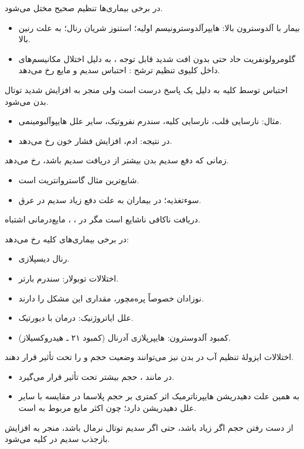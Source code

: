 \documentclass[12pt,a4paper]{article}
\begin{document}
در برخی بیماری‌ها تنظیم صحیح  مختل می‌شود.
\begin{itemize}
\item بیمار با آلدوسترون بالا: هایپرآلدوسترونیسم اولیه؛ استنوز شریان رنال؛ به علت رنین بالا.
\item گلومرولونفریت حاد حتی بدون افت شدید قابل توجه ، به دلیل اختلال مکانیسم‌های داخل کلیوی تنظیم ترشح : احتباس سدیم و  مایع رخ می‌دهد.
\end{itemize}
احتباس  توسط کلیه به دلیل  یک پاسخ درست است ولی منجر به افزایش شدید  توتال بدن می‌شود.
\begin{itemize}
\item مثال: نارسایی قلب، نارسایی کلیه، سندرم نفروتیک، سایر علل هایپوآلبومینمی.
\item در نتیجه: ادم، افزایش فشار خون رخ می‌دهد.
\end{itemize}
زمانی که دفع سدیم بدن بیشتر از دریافت سدیم باشد،  رخ می‌دهد.
\begin{itemize}
\item شایع‌ترین مثال گاستروانتریت است.
\item سوءتغذیه؛ در بیماران  به علت دفع زیاد سدیم در عرق.
\end{itemize}
دریافت ناکافی  ناشایع است مگر در ، ، مایع‌درمانی اشتباه.

 در برخی بیماری‌های کلیه رخ می‌دهد:
\begin{itemize}
\item رنال دیسپلازی.
\item اختلالات توبولار: سندرم بارتر.
\item نوزادان خصوصاً پره‌مچور، مقداری این مشکل را دارند.
\item علل ایاتروژنیک: درمان با دیورتیک.
\item کمبود آلدوسترون: هایپرپلازی  آدرنال (کمبود ۲۱ ـ هیدروکسیلاز).
\end{itemize}

اختلالات ایزولهٔ تنظیم آب در بدن نیز می‌توانند وضعیت حجم و  را تحت تأثیر قرار دهند.
\begin{itemize}
\item در  مانند ، حجم  بیشتر تحت تأثیر قرار می‌گیرد.
\item به همین علت دهیدریشن هایپرناترمیک اثر کمتری بر حجم پلاسما در مقایسه با سایر علل دهیدریشن دارد؛ چون اکثر مایع مربوط به  است.
\end{itemize}
از دست رفتن حجم اگر زیاد باشد، حتی اگر سدیم توتال نرمال باشد، منجر به افزایش بازجذب سدیم در کلیه می‌شود.
\end{document}
